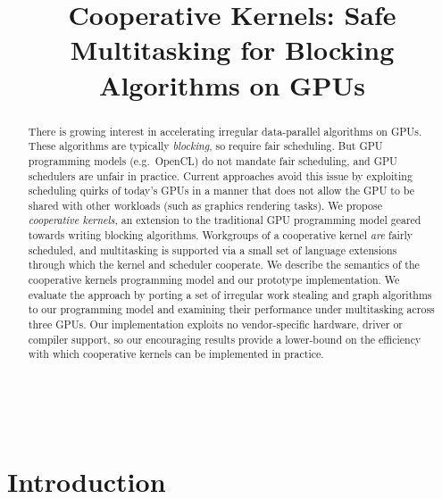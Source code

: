 \documentclass[numbers,nocopyrightspace,10pt]{sigplanconf}
\begin{document}
\title{Cooperative Kernels: Safe Multitasking for Blocking Algorithms on GPUs}

%
%

\authorinfo{}
{\makebox{} \\
}
{}




\maketitle

\vspace{-3mm}
\begin{abstract}
There is growing interest in accelerating irregular data-parallel
algorithms on GPUs.  These algorithms are typically \emph{blocking},
so require fair scheduling.  But GPU programming models (e.g.\ OpenCL)
do not mandate fair scheduling, and GPU schedulers are
unfair in practice.  Current approaches avoid this issue by exploiting
scheduling quirks of today's GPUs in a manner that does not
allow the GPU to be shared with other workloads (such as graphics
rendering tasks).  We propose \emph{cooperative kernels}, an extension
to the traditional GPU programming model geared towards writing
blocking algorithms.  Workgroups of a cooperative kernel \emph{are}
fairly scheduled, and multitasking is supported via a small set of
language extensions through which the kernel and scheduler cooperate.
We describe the semantics of the cooperative kernels programming model
and our prototype implementation.  We evaluate the approach by porting
a set of irregular work stealing and graph algorithms to our
programming model and examining their performance under multitasking
across three GPUs.  Our implementation exploits no
vendor-specific hardware, driver or compiler support, so our encouraging
results provide a lower-bound on the efficiency with
which cooperative kernels can be implemented in practice.

\end{abstract}
    
\section{Introduction}\label{sec:intro}
\end{document}
